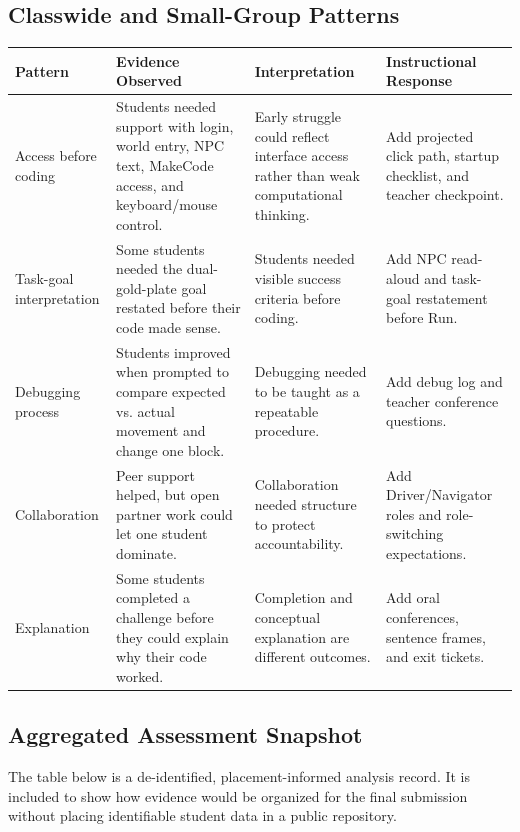 \documentclass[12pt]{article}
\begin{document}
\newpage
\subsection{Classwide and Small-Group Patterns}

\begin{xltabular}{\textwidth}{|P{1.0in}|P{2.0in}|P{1.6in}|P{1.6in}|}
\hline
{}\color{white}\bfseries Pattern & \color{white}\bfseries Evidence Observed & \color{white}\bfseries Interpretation & \color{white}\bfseries Instructional Response \\
\hline
Access before coding & Students needed support with login, world entry, NPC text, MakeCode access, and keyboard/mouse control. & Early struggle could reflect interface access rather than weak computational thinking. & Add projected click path, startup checklist, and teacher checkpoint. \\
\hline
{} Task-goal interpretation & Some students needed the dual-gold-plate goal restated before their code made sense. & Students needed visible success criteria before coding. & Add NPC read-aloud and task-goal restatement before Run. \\
\hline
Debugging process & Students improved when prompted to compare expected vs. actual movement and change one block. & Debugging needed to be taught as a repeatable procedure. & Add debug log and teacher conference questions. \\
\hline
{} Collaboration & Peer support helped, but open partner work could let one student dominate. & Collaboration needed structure to protect accountability. & Add Driver/Navigator roles and role-switching expectations. \\
\hline
Explanation & Some students completed a challenge before they could explain why their code worked. & Completion and conceptual explanation are different outcomes. & Add oral conferences, sentence frames, and exit tickets. \\
\hline
\end{xltabular}

\subsection{Aggregated Assessment Snapshot}

The table below is a de-identified, placement-informed analysis record. It is included to show how evidence would be organized for the final submission without placing identifiable student data in a public repository.
\end{document}
